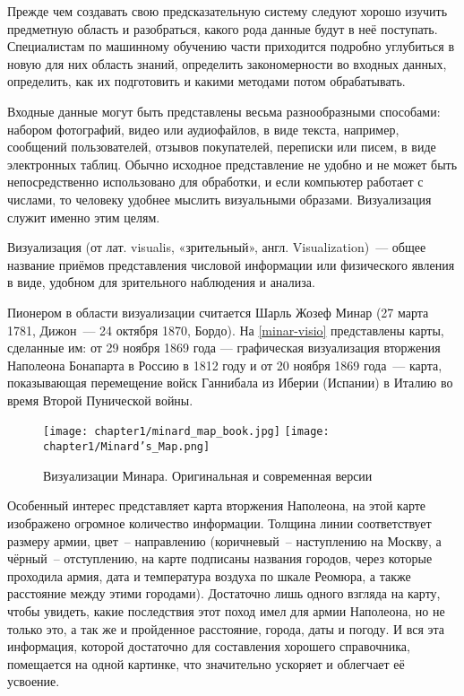 Прежде чем создавать свою предсказательную систему следуют хорошо изучить предметную область и разобраться, какого рода данные будут в неё поступать. Специалистам по машинному обучению части приходится подробно углубиться в новую для них область знаний, определить закономерности во входных данных, определить, как их подготовить и какими методами потом обрабатывать.

Входные данные могут быть представлены весьма разнообразными способами: набором фотографий, видео или аудиофайлов, в виде текста, например, сообщений пользователей, отзывов покупателей, переписки или писем, в виде электронных таблиц. Обычно исходное представление не удобно и не может быть непосредственно использовано для обработки, и если компьютер работает с числами, то человеку удобнее мыслить визуальными образами. Визуализация служит именно этим целям.

Визуализация (от лат. visualis, «зрительный», англ. Visualization)~— общее название приёмов представления числовой информации или физического явления в виде, удобном для зрительного наблюдения и анализа\cite{wiki:visualization_def}.

Пионером в области визуализации считается Шарль Жозеф Минар (27 марта 1781, Дижон~— 24 октября 1870, Бордо). На \autoref{minar-visio} представлены карты, сделанные им: от 29 ноября 1869 года — графическая визуализация вторжения Наполеона Бонапарта в Россию в 1812 году и от 20 ноября 1869 года~— карта, показывающая перемещение войск Ганнибала из Иберии (Испании) в Италию во время Второй Пунической войны.

\begin{figure}[H]
    \centering
    \texttt{[image: chapter1/minard\_map\_book.jpg]}    
    \texttt{[image: chapter1/Minard's\_Map.png]}
    \caption{Визуализации Минара. Оригинальная и современная версии}
    \label{minar-visio}
\end{figure}

Особенный интерес представляет карта вторжения Наполеона, на этой карте изображено огромное количество информации. Толщина линии соответствует размеру армии, цвет~\--- направлению (коричневый~\--- наступлению на Москву, а чёрный~\--- отступлению, на карте подписаны названия городов, через которые проходила армия, дата и температура воздуха по шкале Реомюра, а также расстояние между этими городами). Достаточно лишь одного взгляда на карту, чтобы увидеть, какие последствия этот поход имел для армии Наполеона, но не только это, а так же и пройденное расстояние, города, даты и погоду. И вся эта информация, которой достаточно для составления хорошего справочника, помещается на одной картинке, что значительно ускоряет и облегчает её усвоение.

